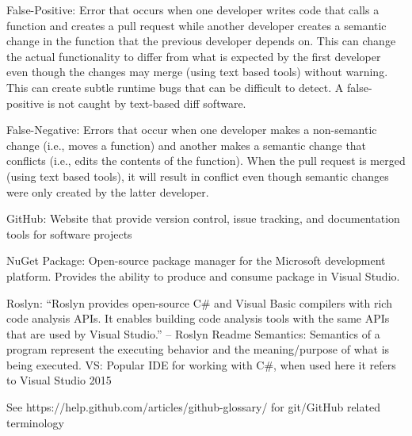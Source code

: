 \documentclass[draftclsnofoot,onecolumn]{IEEEtran}
\begin{document}
False-Positive: Error that occurs when one developer writes code that calls a function and creates a pull request while another developer creates a semantic change in the function that the previous developer depends on. This can change the actual functionality to differ from what is expected by the first developer even though the changes may merge (using text based tools) without warning. This can create subtle runtime bugs that can be difficult to detect. A false-positive is not caught by text-based diff software.

False-Negative: Errors that occur when one developer makes a non-semantic change (i.e., moves a function) and another makes a semantic change that conflicts (i.e., edits the contents of the function). When the pull request is merged (using text based tools), it will result in conflict even though semantic changes were only created by the latter developer.

GitHub: Website that provide version control, issue tracking, and documentation tools for software projects

NuGet Package: Open-source package manager for the Microsoft development platform. Provides the ability to produce and consume package in Visual Studio.

Roslyn: “Roslyn provides open-source C\# and Visual Basic compilers with rich code analysis APIs. It enables building code analysis tools with the same APIs that are used by Visual Studio.” – Roslyn Readme 
Semantics: Semantics of a program represent the executing behavior and the meaning/purpose of what is being executed. 
VS: Popular IDE for working with C\#, when used here it refers to Visual Studio 2015

See https://help.github.com/articles/github-glossary/ for git/GitHub related terminology
\end{document}
